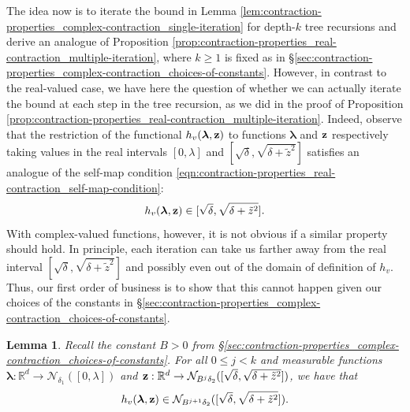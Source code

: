 \documentclass[11pt]{article}
\newcommand{\R}{\mathbb R}
\newcommand{\bl}{\bm{\lambda}}
\newcommand{\bz}{\vb{z}}
\newcommand{\tz}{\tilde{z}}
\numberwithin{equation}{section}
\theoremstyle{plain}
\newtheorem{lemma}[theorem]{Lemma}
\theoremstyle{definition}
\theoremstyle{remark}
\begin{document}
The idea now is to iterate the bound in Lemma \ref{lem:contraction-properties_complex-contraction_single-iteration} for depth-$k$ tree recursions and derive an analogue of Proposition \ref{prop:contraction-properties_real-contraction_multiple-iteration}, where $k\ge 1$ is fixed as in \S\ref{sec:contraction-properties_complex-contraction_choices-of-constants}.
However, in contrast to the real-valued case, we have here the question of whether we can actually iterate the bound at each step in the tree recursion, as we did in the proof of Proposition \ref{prop:contraction-properties_real-contraction_multiple-iteration}.
Indeed, observe that the restriction of the functional $h_{v}(\bl,\bz)$ to functions $\bl$ and $\bz$ respectively taking values in the real intervals $[0,\lambda]$ and $[\sqrt{\delta},\sqrt{\delta+\tz^{2}}]$ satisfies an analogue of the self-map condition \eqref{eqn:contraction-properties_real-contraction_self-map-condition}: 
\begin{equation}
\label{eqn:contraction-properties_complex-contraction_self-map-condition}
h_{v}(\bl,\bz)\in[\sqrt{\delta},\sqrt{\delta+\tz^{2}}].
\end{equation}
With complex-valued functions, however, it is not obvious if a similar property should hold.
In principle, each iteration can take us farther away from the real interval $[\sqrt{\delta},\sqrt{\delta+\tz^{2}}]$ and possibly even out of the domain of definition of $h_{v}$.
Thus, our first order of business is to show that this cannot happen given our choices of the constants in \S\ref{sec:contraction-properties_complex-contraction_choices-of-constants}.

\begin{lemma}
\label{lem:contraction-properties_complex-contraction_deviation-extent}
Recall the constant $B>0$ from \S\ref{sec:contraction-properties_complex-contraction_choices-of-constants}.
For all $0\le j<k$ and measurable functions $\bl:\R^{d}\rightarrow\mathcal{N}_{\delta_{1}}([0,\lambda])$ and $\bz:\R^{d}\rightarrow\mathcal{N}_{B^{j}\delta_{2}}([\sqrt{\delta},\sqrt{\delta+\tz^{2}}])$, we have that
\begin{equation}
h_{v}(\bl,\bz)\in\mathcal{N}_{B^{j+1}\delta_{2}}([\sqrt{\delta},\sqrt{\delta+\tz^{2}}]).
\end{equation}
\end{lemma}
\end{document}
